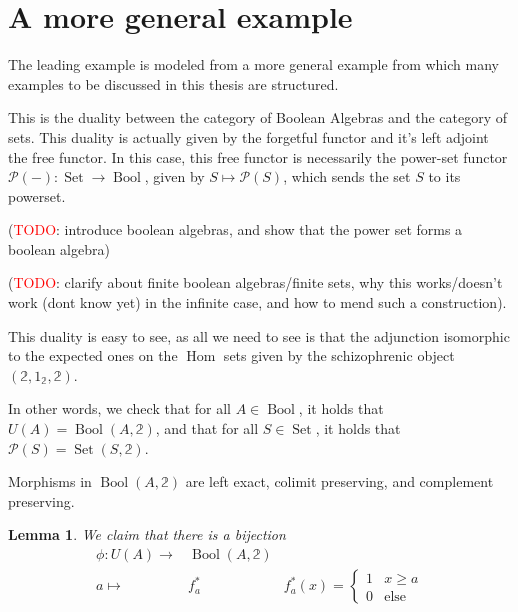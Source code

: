 \documentclass[12pt,a4paper]{article}
\newtheorem{lemma}{Lemma}[section] %
\DeclareMathOperator{\Hom}{Hom}
\DeclareMathOperator{\Set}{Set}
\DeclareMathOperator{\Bool}{Bool}
\begin{document}
\section{A more general example}

The leading example is modeled from a more general example from which many examples to be discussed in this thesis are structured. 

This is the duality between the category of Boolean Algebras and the category of sets. This duality is actually given by the forgetful functor and it's left adjoint the free functor. In this case, this free functor is necessarily the power-set functor $\mathcal{P}(-): \Set \to \Bool$, given by $S \mapsto \mathcal{P}(S)$, which sends the set $S$ to its powerset.  

(\textcolor{red}{TODO}: introduce boolean algebras, and show that the power set forms a boolean algebra) 

(\textcolor{red}{TODO}: clarify about finite boolean algebras/finite sets, why this works/doesn't work (dont know yet) in the infinite case, and how to mend such a construction). 

This duality is easy to see, as all we need to see is that the adjunction isomorphic to the expected ones on the $\Hom$ sets given by the schizophrenic object $(\mathbb{2}, 1_{\mathbb{2}}, \mathbb{2})$. 

In other words, we check that for all $A \in \Bool$, it holds that $U(A) = \Bool(A, \mathbb{2})$, and that for all $S \in \Set$, it holds that $\mathcal{P}(S) = \Set(S, \mathbb{2})$. 

 Morphisms in $\Bool(A, \mathbb{2})$ are left exact, colimit preserving, and complement preserving.
 
\begin{lemma}
	We claim that there is a bijection \begin{align*}
  	\phi: U(A) \to& \Bool(A, \mathbb{2})\\
  	a \mapsto& f^*_a &f^*_a(x) = \begin{cases}
   1 & x \geq a \\
    0 & \text{else}
  \end{cases}
  \end{align*}
\end{lemma}

  
 
\end{document}
